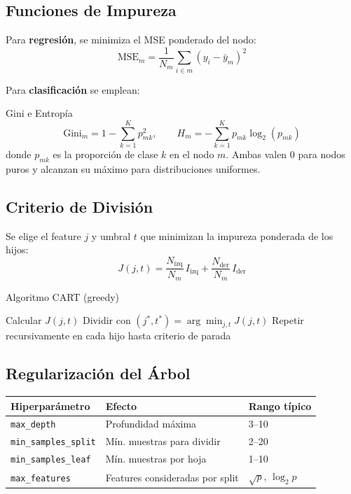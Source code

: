 \documentclass[12pt, a4paper]{article}
\begin{document}
\subsection{Funciones de Impureza}

Para \textbf{regresión}, se minimiza el MSE ponderado del nodo:
\[
	\text{MSE}_m = \frac{1}{N_m}\sum_{i \in m}(y_i - \bar{y}_m)^2
\]

Para \textbf{clasificación} se emplean:
\begin{defbox}{Gini e Entropía}
	\[
		\text{Gini}_m = 1 - \sum_{k=1}^{K} p_{mk}^2, \qquad
		H_m = -\sum_{k=1}^{K} p_{mk}\log_2(p_{mk})
	\]
	donde $p_{mk}$ es la proporción de clase $k$ en el nodo $m$.
	Ambas valen 0 para nodos puros y alcanzan su máximo para distribuciones uniformes.
\end{defbox}

\subsection{Criterio de División}

Se elige el feature $j$ y umbral $t$ que minimizan la impureza ponderada de los hijos:
\[
	J(j, t) = \frac{N_{\text{izq}}}{N_m}\,I_{\text{izq}} + \frac{N_{\text{der}}}{N_m}\,I_{\text{der}}
\]

\begin{algbox}{Algoritmo CART (greedy)}
	\begin{algorithmic}[1]
		\State Calcular $J(j,t)$
		\EndFor
		\State Dividir con $(j^*, t^*) = \arg\min_{j,t} J(j,t)$
		\State Repetir recursivamente en cada hijo hasta criterio de parada
	\end{algorithmic}
\end{algbox}

\subsection{Regularización del Árbol}

\begin{center}
	\begin{tabular}{lll}
		\toprule
		\textbf{Hiperparámetro}      & \textbf{Efecto}                 & \textbf{Rango típico}  \\
		\midrule
		\texttt{max\_depth}          & Profundidad máxima              & 3–10                   \\
		\texttt{min\_samples\_split} & Mín. muestras para dividir      & 2–20                   \\
		\texttt{min\_samples\_leaf}  & Mín. muestras por hoja          & 1–10                   \\
		\texttt{max\_features}       & Features consideradas por split & $\sqrt{p}$, $\log_2 p$ \\
		\bottomrule
	\end{tabular}
\end{center}
\end{document}
